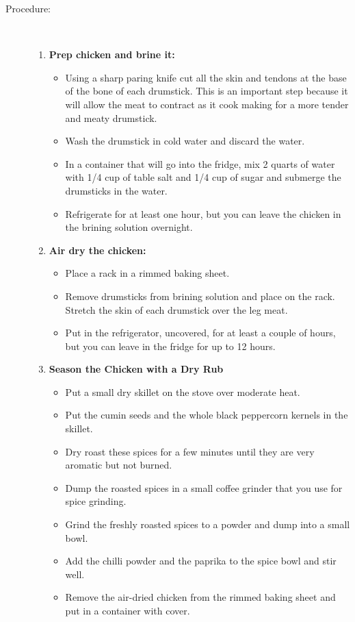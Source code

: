 \documentclass[11pt,letterpaper]{article}
\begin{document}
\begin{description}
\item[Procedure:]\ \\
	\begin{enumerate}
	\item {\bf Prep chicken and brine it:}
		\begin{itemize}
		\item Using a sharp paring knife cut all the skin and tendons at the base of the bone of each drumstick. This is an important step because it will allow the meat to contract as it cook making for a more tender and meaty drumstick. 
		\item Wash the drumstick in cold water and discard the water.
		\item In  a container that will go into the fridge,  mix 2 quarts of water with 1/4 cup of table salt and 1/4 cup of sugar and submerge the drumsticks in the water.
		\item Refrigerate for at least one hour, but you can leave the chicken in the brining solution overnight.
		\end{itemize}
	\item {\bf Air dry the chicken:}
		\begin{itemize}
		\item Place a rack in a rimmed baking sheet.
		\item Remove drumsticks from brining solution and place on the rack. Stretch the skin of each drumstick over the leg meat.
		\item Put in the refrigerator, uncovered, for at least a couple of hours, but you can leave in the fridge for up to 12 hours. 
		\end{itemize}
	\item {\bf Season the Chicken with a Dry Rub}
		\begin{itemize}
		\item Put a small dry skillet on the stove over moderate heat.
		\item Put the cumin seeds and the whole black peppercorn kernels in the skillet.
		\item Dry roast these spices for a few minutes until they are very aromatic but not burned.
		\item Dump the roasted spices in a small coffee grinder that you use for spice grinding.
		\item Grind the freshly roasted spices to a powder and dump into a small bowl.
		\item Add the chilli powder and the paprika to the spice bowl and stir well.
		\item Remove the air-dried chicken from the rimmed baking sheet and put in a container with cover.

\end{itemize}
\end{enumerate}
\end{description}
\end{document}
